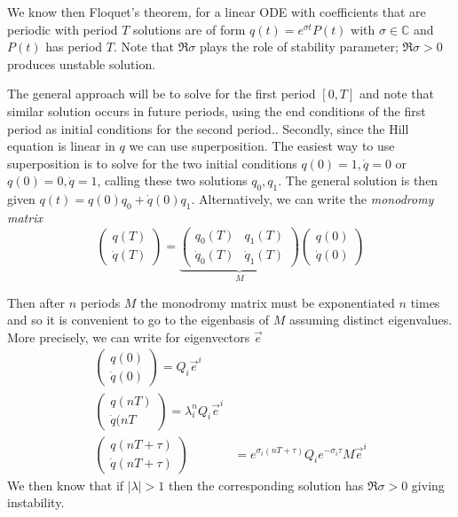 \documentclass[10pt]{report}
\newcommand{\abs}[1]{\left|#1\right|}
\begin{document}
We know then Floquet's theorem, for a linear ODE with coefficients that are periodic with period $T$ solutions are of form $q(t) = e^{\sigma t}P(t)$ with $\sigma \in \mathbb{C}$ and $P(t)$ has period $T$. Note that $\Re\sigma$ plays the role of stability parameter; $\Re\sigma > 0$ produces unstable solution.

The general approach will be to solve for the first period $[0,T]$ and note that similar solution occurs in future periods, using the end conditions of the first period as initial conditions for the second period.. Secondly, since the Hill equation is linear in $q$ we can use superposition. The easiest way to use superposition is to solve for the two initial conditions $q(0) = 1, \dot{q} = 0$ or $q(0) = 0, \dot{q} = 1$, calling these two solutions $q_0, q_1$. The general solution is then given $q(t) = q(0)q_0 + \dot{q}(0)q_1$. Alternatively, we can write the \emph{monodromy matrix}
\begin{equation}
    \begin{pmatrix} q(T)\\ \dot{q}(T) \end{pmatrix} = \underbrace{\begin{pmatrix} q_0(T) & q_1(T)\\ \dot{q}_0(T) & \dot{q}_1(T) \end{pmatrix}}_{M}\begin{pmatrix} q(0)\\ \dot{q}(0) \end{pmatrix} 
    \label{1.23.monodromy}
\end{equation}

Then after $n$ periods $M$ the monodromy matrix must be exponentiated $n$ times and so it is convenient to go to the eigenbasis of $M$ assuming distinct eigenvalues. More precisely, we can write for eigenvectors $\vec{e}$
\begin{align}
    \begin{pmatrix} q(0)\\ \dot{q}(0) \end{pmatrix} = Q_i\vec{e}^i\\
    \begin{pmatrix} q(nT)\\ \dot{q}(nT \end{pmatrix} = \lambda_i^n Q_i \vec{e}^i\\
    \begin{pmatrix} q(nT + \tau)\\ \dot{q}(nT + \tau) \end{pmatrix} &= e^{\sigma_i (nT + \tau)}Q_ie^{-\sigma_i \tau}M\vec{e}^{i}
    \label{1.23.solHill}
\end{align}
We then know that if $\abs{\lambda} > 1$ then the corresponding solution has $\Re \sigma > 0$ giving instability.
\end{document}
